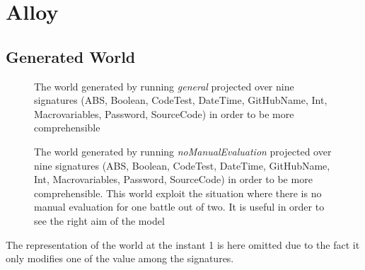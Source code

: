 \section{Alloy}
\lstset{
  language=alloy,
  basicstyle=\small\ttfamily,
  breaklines=true,
  showstringspaces=false
}


\subsection{Generated World}
\begin{figure}[h]
  \centering
  \caption{The world generated by running \textit{general} projected over nine signatures (ABS, Boolean, CodeTest, DateTime, GitHubName, Int, Macrovariables, Password, SourceCode) in order to be more comprehensible}
\end{figure}

\begin{figure}[h]
  \centering
  \caption{The world generated by running \textit{noManualEvaluation} projected over nine signatures (ABS, Boolean, CodeTest, DateTime, GitHubName, Int, Macrovariables, Password, SourceCode) in order to be more comprehensible. This world exploit the situation where there is no manual evaluation for one battle out of two. It is useful in order to see the right aim of the model}
\end{figure}

The representation of the world at the instant 1 is here omitted due to the fact it only modifies one of the value among the signatures.